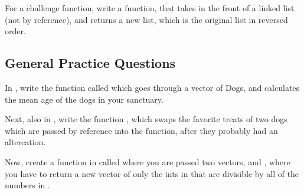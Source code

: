\documentclass{tufte-handout}
\begin{document}
For a  challenge function, write a function,  that takes in the front of a linked list (not by reference), and returns a new list, which is the original list in reversed order.  

\subsection{General Practice Questions}

In , write the function called  which goes through a vector of Dogs, and calculates the mean age of the dogs in your sanctuary.

Next, also in , write the function , which swaps the favorite treats of two dogs which are passed by reference into the function, after they probably had an altercation.

Now, create a function in  called  where you are passed two vectors,  and , where you have to return a new vector of only the ints in  that are divisible by all of the numbers in .
\end{document}
